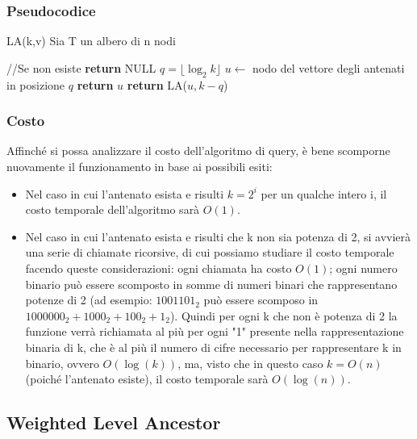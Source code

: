 \documentclass{article}
\begin{document}
\subsubsection{Pseudocodice}
LA(k,v)\newline
Sia T un albero di n nodi
\begin{algorithmic}
	 //Se non esiste
	\State \textbf{return} NULL
	\Else   
	\State $q = \lfloor\log_2{k}\rfloor$
	\State $u \gets$ nodo del vettore degli antenati in posizione $q$
	\State \textbf{return} $u$
	\Else
	\State \textbf{return} LA($u, k-q$)
	\EndIf
	\EndIf
\end{algorithmic}
\subsubsection{Costo}
Affinché si possa analizzare il costo dell'algoritmo di query, è bene scomporne nuovamente il funzionamento in base ai possibili esiti:
\begin{itemize}
	\item Nel caso in cui l'antenato esista e risulti $k = 2^i$ per un qualche intero i, il costo temporale dell'algoritmo sarà $O(1)$.
	\item Nel caso in cui l'antenato esista e risulti che k non sia potenza di 2, si avvierà una serie di chiamate ricorsive, di cui possiamo studiare il costo temporale facendo queste considerazioni: ogni chiamata ha costo $O(1)$; ogni numero binario può essere scomposto in somme di numeri binari che rappresentano potenze di 2 (ad esempio: $1001101_2$ può essere scomposo in $1000000_2 + 1000_2 + 100_2 +1_2$). Quindi per ogni k che non è potenza di 2 la funzione verrà richiamata al più per ogni "1" presente nella rappresentazione binaria di k, che è al più il numero di cifre necessario per rappresentare k in binario, ovvero $O(\log(k))$, ma, visto che in questo caso $k = O(n)$ (poiché l'antenato esiste), il costo temporale sarà $O(\log(n))$.
\end{itemize}

\subsection{Weighted Level Ancestor}
\end{document}
